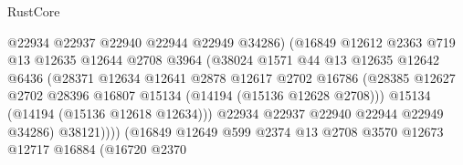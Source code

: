 \begin{lexlean}{RustCore}
\begin{coremodule}
                                      @22934
                                      @22937
                                      @22940
                                      @22944
                                      @22949
                                      @34286)
                                    (@16849
                                      @12612
                                      @2363
                                      @719
                                      @13
                                      @12635
                                      @12644
                                      @2708
                                      @3964
                                      (@38024
                                        @1571
                                        @44
                                        @13
                                        @12635
                                        @12642
                                        @6436
                                        (@28371
                                          @12634
                                          @12641
                                          @2878
                                          @12617
                                          @2702
                                          @16786
                                          (@28385
                                            @12627
                                            @2702
                                            @28396
                                            @16807
                                            @15134
                                            (@14194 (@15136 @12628 @2708)))
                                          @15134
                                          (@14194 (@15136 @12618 @12634)))
                                        @22934
                                        @22937
                                        @22940
                                        @22944
                                        @22949
                                        @34286)
                                      @38121))))
                              (@16849
                                @12649
                                @599
                                @2374
                                @13
                                @2708
                                @3570
                                @12673
                                @12717
                                @16884
                                (@16720
                                  @2370

\end{coremodule}
\end{lexlean}
